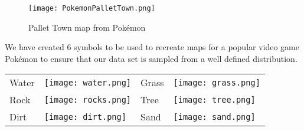 \begin{figure}
\begin{center}
\texttt{[image: PokemonPalletTown.png]}
\end{center}
\caption{Pallet Town map from Pok\'{e}mon\cite{firered}} 
\end{figure}


We have created 6 symbols to be used to recreate maps for a popular video game
Pok\'{e}mon to ensure that our data set is sampled from a well defined distribution.

\begin{tabular}{llll}
Water & \texttt{[image: water.png]} &
Grass & \texttt{[image: grass.png]} \\
Rock & \texttt{[image: rocks.png]} &
Tree & \texttt{[image: tree.png]} \\
Dirt & \texttt{[image: dirt.png]} &
Sand & \texttt{[image: sand.png]} \\
\end{tabular}



